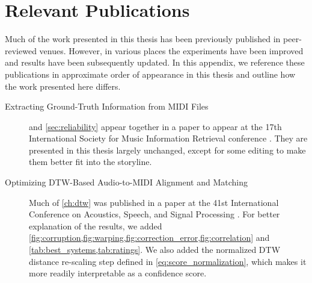 \chapter{Relevant Publications}

Much of the work presented in this thesis has been previously published in peer-reviewed venues.
However, in various places the experiments have been improved and results have been subsequently updated.
In this appendix, we reference these publications in approximate order of appearance in this thesis and outline how the work presented here differs.

\begin{description}
\item[Extracting Ground-Truth Information from MIDI Files]$\;$\\  and \cref{sec:reliability} appear together in a paper to appear at the 17th International Society for Music Information Retrieval conference \cite{raffel2016extracting}.
They are presented in this thesis largely unchanged, except for some editing to make them better fit into the storyline.

\item[Optimizing DTW-Based Audio-to-MIDI Alignment and Matching]$\;$\\ Much of \cref{ch:dtw} was published in a paper at the 41st International Conference on Acoustics, Speech, and Signal Processing \cite{raffel2016optimizing}.
For better explanation of the results, we added \cref{fig:corruption,fig:warping,fig:correction_error,fig:correlation} and \cref{tab:best_systems,tab:ratings}.
We also added the normalized DTW distance re-scaling step defined in \cref{eq:score_normalization}, which makes it more readily interpretable as a confidence score.


\end{description}
